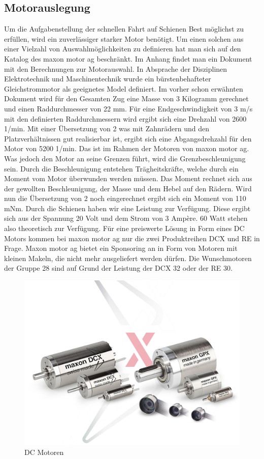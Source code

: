 \documentclass[../../main.tex]{subfiles}
\begin{document}
    \subsection{Motorauslegung}
          Um die Aufgabenstellung der schnellen Fahrt auf Schienen Best möglichst zu erfüllen, wird ein zuverlässiger starker Motor benötigt. Um einen solchen aus einer Vielzahl von Auswahlmöglichkeiten zu definieren hat man sich auf den Katalog des maxon motor ag beschränkt. Im Anhang findet man ein Dokument mit den Berechnungen zur Motorauswahl. In Absprache der Disziplinen Elektrotechnik und Maschinentechnik wurde ein bürstenbehafteter Gleichstrommotor als geeignetes Model definiert. Im vorher schon erwähnten Dokument wird für den Gesamten Zug eine Masse von 3 Kilogramm gerechnet und einen Raddurchmesser von 22 mm. Für eine Endgeschwindigkeit von 3 m/s mit den definierten Raddurchmessern wird ergibt sich eine Drehzahl von 2600 1/min. Mit einer Übersetzung von 2 was mit Zahnrädern und den Platzverhältnissen gut realisierbar ist, ergibt sich eine Abgangsdrehzahl für den Motor von 5200 1/min. Das ist im Rahmen der Motoren von maxon motor ag. Was jedoch den Motor an seine Grenzen führt, wird die Grenzbeschleunigung sein. Durch die Beschleunigung entstehen Trägheitskräfte, welche durch ein Moment vom Motor überwunden werden müssen. Das Moment rechnet sich aus der gewollten Beschleunigung, der Masse und dem Hebel auf den Rädern. Wird nun die Übersetzung von 2 noch eingerechnet ergibt sich ein Moment von 110 mNm. Durch die Schienen haben wir eine Leistung zur Verfügung. Diese ergibt sich aus der Spannung 20 Volt und dem Strom von 3 Ampère. 60 Watt stehen also theoretisch zur Verfügung. Für eine preiswerte Lösung in Form eines DC Motors kommen bei maxon motor ag nur die zwei Produktreihen DCX und RE in Frage. Maxon motor ag bietet ein Sponsoring an in Form von Motoren mit kleinen Makeln, die nicht mehr ausgeliefert werden dürfen. Die Wunschmotoren der Gruppe 28 sind auf Grund der Leistung der DCX 32 oder der RE 30.

    \begin{figure}[H]
        \centering
        \includegraphics[width=1.0\textwidth]{../../images/Kran/Motors.JPG}
        \caption {DC Motoren}
        \label{fig:et_komponenten}
    \end{figure}


    
\end{document}
